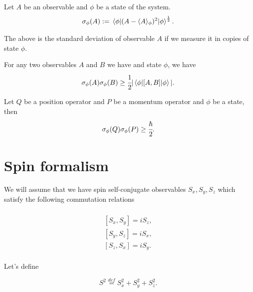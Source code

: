 \documentclass[main.tex]{subfiles}
\begin{document}
\begin{definition}
Let $A$ be an observable and $\phi$ be a state of the system.
\begin{equation}
\sigma_\phi(A) := \mel{\phi}{(A - \langle A \rangle_\phi)^2}{\phi}^{\frac{1}{2}}.
\end{equation}
\end{definition}
The above is the standard deviation of observable $A$ if we measure it in copies of state $\phi$.

\begin{theorem}
For any two observables $A$ and $B$ we have and state $\phi$, we have
\begin{equation}
\sigma_\phi(A)\sigma_\phi(B) \geq \cfrac{1}{2} |\mel{\phi}{[A,B]}{\phi}|.
\end{equation}
\end{theorem}
\begin{corollary} Let $Q$ be a position operator and $P$ be a momentum operator and $\phi$ be a state, then
\begin{equation} 
\sigma_\phi(Q)\sigma_\phi(P) \geq \cfrac{\hbar}{2}.
\end{equation}
\end{corollary}
\section{Spin formalism}
We will assume that we have spin self-conjugate observables $S_x, S_y, S_z$ which satisfy the following commutation relations

\begin{multline}
\label{spin-cummutators}\\
[S_x, S_y] = iS_z,\\
[S_y, S_z] = iS_x,\\
[S_z, S_x] = iS_y.\\
\end{multline}

Let's define

\begin{equation}
S^2  \stackrel{def}{=} S^2_x + S^2_y + S^2_z.
\end{equation}
\end{document}
